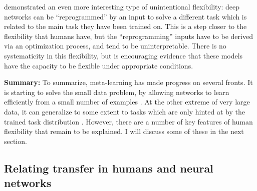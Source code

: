 \documentclass[11pt]{article}
\begin{document}
\citet{Elsayed} demonstrated an even more interesting type of unintentional flexibility: deep networks can be ``reprogrammed'' by an input to solve a different task which is related to the main task they have been trained on. This is a step closer to the flexibility that humans have, but the ``reprogramming'' inputs have to be derived via an optimization process, and tend to be uninterpretable. There is no systematicity in this flexibility, but is encouraging evidence that these models have the capacity to be flexible under appropriate conditions. \par  
\textbf{Summary:} To summarize, meta-learning has made progress on several fronts. It is starting to solve the small data problem, by allowing networks to learn efficiently from a small number of examples \citep[e.g.]{Wang2016a}. At the other extreme of very large data, it can generalize to some extent to tasks which are only hinted at by the trained task distribution \citep[e.g.]{Radford2019}. However, there are a number of key features of human flexibility that remain to be explained. I will discuss some of these in the next section. \par 


\subsection{Relating transfer in humans and neural networks}
\end{document}
